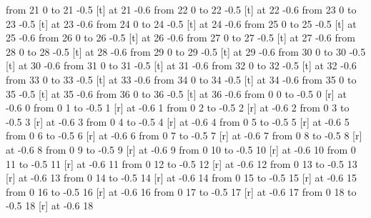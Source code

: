 \putrule from 21 0 to 21 -0.5
 [t] at 21 -0.6
\putrule from 22 0 to 22 -0.5
 [t] at 22 -0.6
\putrule from 23 0 to 23 -0.5
 [t] at 23 -0.6
\putrule from 24 0 to 24 -0.5
 [t] at 24 -0.6
\putrule from 25 0 to 25 -0.5
 [t] at 25 -0.6
\putrule from 26 0 to 26 -0.5
 [t] at 26 -0.6
\putrule from 27 0 to 27 -0.5
 [t] at 27 -0.6
\putrule from 28 0 to 28 -0.5
 [t] at 28 -0.6
\putrule from 29 0 to 29 -0.5
 [t] at 29 -0.6
\putrule from 30 0 to 30 -0.5
 [t] at 30 -0.6
\putrule from 31 0 to 31 -0.5
 [t] at 31 -0.6
\putrule from 32 0 to 32 -0.5
 [t] at 32 -0.6
\putrule from 33 0 to 33 -0.5
 [t] at 33 -0.6
\putrule from 34 0 to 34 -0.5
 [t] at 34 -0.6
\putrule from 35 0 to 35 -0.5
 [t] at 35 -0.6
\putrule from 36 0 to 36 -0.5
 [t] at 36 -0.6
\putrule from 0 0 to -0.5 0
 [r] at -0.6 0
\putrule from 0 1 to -0.5 1
 [r] at -0.6 1
\putrule from 0 2 to -0.5 2
 [r] at -0.6 2
\putrule from 0 3 to -0.5 3
 [r] at -0.6 3
\putrule from 0 4 to -0.5 4
 [r] at -0.6 4
\putrule from 0 5 to -0.5 5
 [r] at -0.6 5
\putrule from 0 6 to -0.5 6
 [r] at -0.6 6
\putrule from 0 7 to -0.5 7
 [r] at -0.6 7
\putrule from 0 8 to -0.5 8
 [r] at -0.6 8
\putrule from 0 9 to -0.5 9
 [r] at -0.6 9
\putrule from 0 10 to -0.5 10
 [r] at -0.6 10
\putrule from 0 11 to -0.5 11
 [r] at -0.6 11
\putrule from 0 12 to -0.5 12
 [r] at -0.6 12
\putrule from 0 13 to -0.5 13
 [r] at -0.6 13
\putrule from 0 14 to -0.5 14
 [r] at -0.6 14
\putrule from 0 15 to -0.5 15
 [r] at -0.6 15
\putrule from 0 16 to -0.5 16
 [r] at -0.6 16
\putrule from 0 17 to -0.5 17
 [r] at -0.6 17
\putrule from 0 18 to -0.5 18
 [r] at -0.6 18

